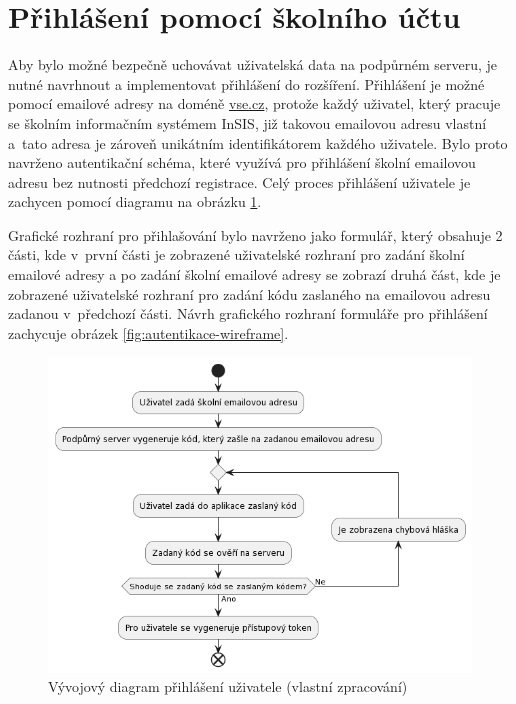 \section{Přihlášení pomocí školního účtu}

Aby bylo možné bezpečně uchovávat uživatelská data na podpůrném serveru, je nutné navrhnout a implementovat přihlášení do rozšíření. Přihlášení je možné pomocí emailové adresy na doméně \url{vse.cz}, protože každý uživatel, který pracuje se školním informačním systémem InSIS, již takovou emailovou adresu vlastní a~tato adresa je zároveň unikátním identifikátorem každého uživatele. Bylo proto navrženo autentikační schéma, které využívá pro přihlášení školní emailovou adresu bez nutnosti předchozí registrace.
Celý proces přihlášení uživatele je zachycen pomocí diagramu na obrázku \ref{fig:autentikace}.

Grafické rozhraní pro přihlašování bylo navrženo jako formulář, který obsahuje 2 části, kde v~první části je zobrazené uživatelské rozhraní pro zadání školní emailové adresy a po zadání školní emailové adresy se zobrazí druhá část, kde je zobrazené uživatelské rozhraní pro zadání kódu zaslaného na emailovou adresu zadanou v~předchozí části.
Návrh grafického rozhraní formuláře pro přihlášení zachycuje obrázek \ref{fig:autentikace-wireframe}.

\begin{figure}[htbp!]\centering
    \includegraphics[width=\textwidth]{img/autentikace.png}
    \caption{Vývojový diagram přihlášení uživatele (vlastní zpracování)}
    \label{fig:autentikace}
\end{figure}

